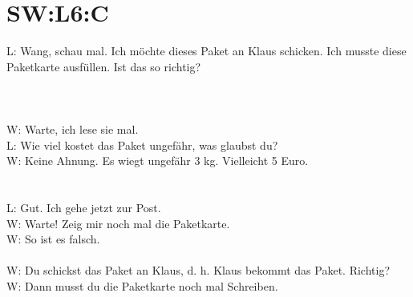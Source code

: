 \section{SW:L6:C}
\noindent
L: Wang, schau mal.  Ich möchte dieses Paket an Klaus schicken. Ich musste diese Paketkarte ausfüllen.  Ist das so richtig?  \\
\\
\\
\\
\noindent
W: Warte, ich lese sie mal.  \\
L: Wie viel kostet das Paket ungefähr, was glaubst du?  \\
W: Keine Ahnung.  Es wiegt ungefähr 3 kg. Vielleicht 5 Euro. \\
\\
\\
\noindent
L: Gut. Ich gehe jetzt zur Post. \\
W: Warte! Zeig mir noch mal die Paketkarte.  \\
W: So ist es falsch.  \\
\\
\noindent
W: Du schickst das Paket an Klaus, d. h.  Klaus bekommt das Paket. Richtig? \\
W: Dann musst du die Paketkarte noch mal Schreiben. \\


